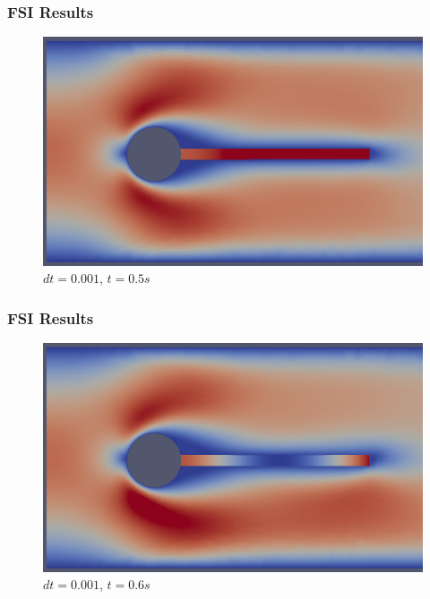 \documentclass{beamer}
\begin{document}
\begin{frame}
\frametitle{FSI Results}
\begin{figure}[h]
\centering
	\includegraphics[width=\textwidth]{t_500}
	\caption{ $dt = 0.001$, $t = 0.5s$}
	\label{fig:t_500}
\end{figure}
\end{frame}

\begin{frame}
\frametitle{FSI Results}
\begin{figure}[h]
\centering
	\includegraphics[width=\textwidth]{t_600}
	\caption{ $dt = 0.001$, $t = 0.6s$}
	\label{fig:t_600}
\end{figure}
\end{frame}
\end{document}
